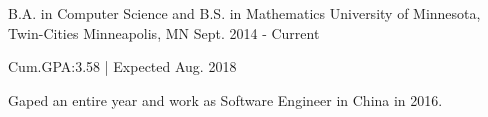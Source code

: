 

\begin{cventries}

  \cventry
    {B.A. in Computer Science and B.S. in Mathematics} %
    {University of Minnesota, Twin-Cities} %
    {Minneapolis, MN} %
    {Sept. 2014 - Current} %
    {
      \begin{cvitems} %
         \item {Cum.GPA:3.58 {\enskip|\enskip} Expected Aug. 2018}
         \item {Gaped an entire year and work as Software Engineer in China in 2016.}
      \end{cvitems}
    }

\end{cventries}
